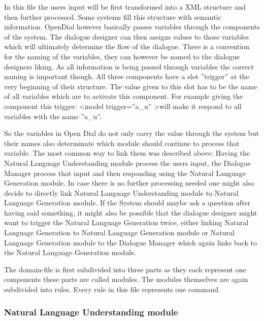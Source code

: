 \documentclass[a4paper, 12pt]{article}
\begin{document}
In this file the users input will be first transformed into a XML structure and then further processed.
Some systems fill this structure with semantic information. 
OpenDial however basically passes variables through the components of the system. 
The dialogue designer can then assigns values to those variables which will ultimately determine the flow of the dialogue. 
There is a convention for the naming of the variables, they can however be named to the dialogue designers liking. 
As all information is being passed through variables the correct naming is important though. 
All three components have a slot ”trigger” at the very beginning of their structure. 
The value given to this slot has to be the name of all variables which are to activate this component.
For example giving the component this trigger: 
\textless model trigger=”a\_u” \textgreater will make it respond to all variables with the name ”a\_u”.  \newline

So the variables in Open Dial do not only carry the value through the system but their names also determinate which module should continue to process that variable. The most common way to link them was described above: Having the Natural Language Understanding module process the users input, the Dialogue Manager process that input and then responding using the Natural Language Generation module. 
In case there is no further processing needed one might also decide to directly link Natural Language Understanding module to Natural Language Generation module. 
If the System should maybe ask a question after having said something, it might also be possible that the dialogue designer might want to trigger the Natural Language Generation twice, either linking Natural Language Generation to Natural Language Generation module or Natural Language Generation module to the Dialogue Manager which again links back to the Natural Language Generation module. \newline

The domain-file is first subdivided into three parts as they each represent one components these parts are called modules. 
The modules themselves are again subdivided into rules. Every rule in this file represents one command. 

\subsubsection{Natural Language Understanding module}
\end{document}
